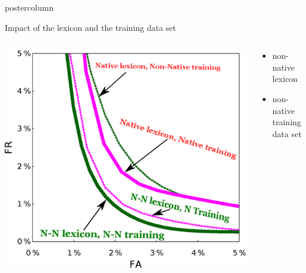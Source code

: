 \documentclass[final,hyperref={pdfpagelabels=false}]{beamer}
\begin{document}
\begin{frame}
\begin{columns}
\begin{column}{.27\textwidth}
\begin{beamercolorbox}[center,wd=\textwidth]{postercolumn}
\begin{minipage}[T]{.95\textwidth}
{            \begin{block}{Impact of the lexicon and the training data set}
		\begin{columns}
			\begin{column}{.55\textwidth}
				\begin{center}\includegraphics{Image/curves/courbeDET_MAC_lex_training}\end{center}
			\end{column}
			\begin{column}{.44\textwidth}
				\begin{itemize}
					\item non-native lexicon
					\item non-native training data set
				\end{itemize}
			\end{column}
		\end{columns}
	   \end{block}

}
\end{minipage}
\end{beamercolorbox}
\end{column}
\end{columns}
\end{frame}
\end{document}
